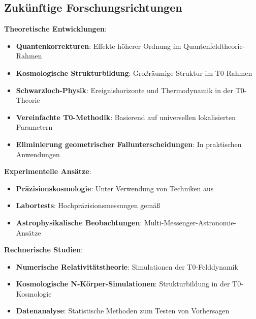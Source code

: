 \documentclass[12pt,a4paper]{article}
\begin{document}
	\subsection{Zukünftige Forschungsrichtungen}
	\label{subsec:future_research}
	
	\textbf{Theoretische Entwicklungen}:
	\begin{itemize}
		\item \textbf{Quantenkorrekturen}: Effekte höherer Ordnung im Quantenfeldtheorie-Rahmen
		\item \textbf{Kosmologische Strukturbildung}: Großräumige Struktur im T0-Rahmen
		\item \textbf{Schwarzloch-Physik}: Ereignishorizonte und Thermodynamik in der T0-Theorie
		\item \textbf{Vereinfachte T0-Methodik}: Basierend auf universellen lokalisierten Parametern
		\item \textbf{Eliminierung geometrischer Fallunterscheidungen}: In praktischen Anwendungen
	\end{itemize}
	
	\textbf{Experimentelle Ansätze}:
	\begin{itemize}
		\item \textbf{Präzisionskosmologie}: Unter Verwendung von Techniken aus \citep{weinberg2008,planck2020}
		\item \textbf{Labortests}: Hochpräzisionsmessungen gemäß \citep{will2014}
		\item \textbf{Astrophysikalische Beobachtungen}: Multi-Messenger-Astronomie-Ansätze \citep{abbott2017}
	\end{itemize}
	
	\textbf{Rechnerische Studien}:
	\begin{itemize}
		\item \textbf{Numerische Relativitätstheorie}: Simulationen der T0-Felddynamik
		\item \textbf{Kosmologische N-Körper-Simulationen}: Strukturbildung in der T0-Kosmologie
		\item \textbf{Datenanalyse}: Statistische Methoden zum Testen von Vorhersagen
	\end{itemize}
	
\end{document}
